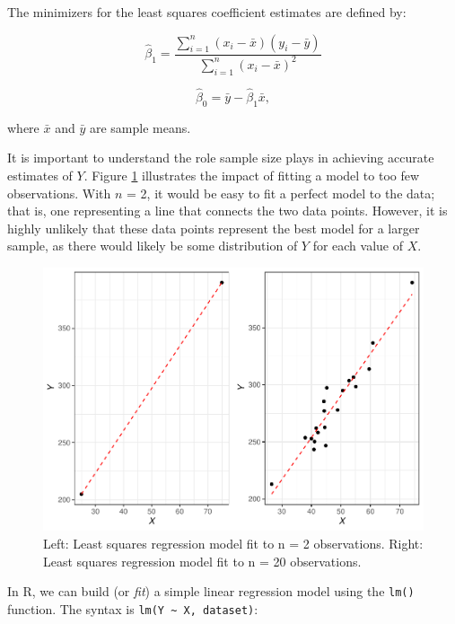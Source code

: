 \documentclass[
]{book}
\begin{document}
The minimizers for the least squares coefficient estimates are defined by:

\[\hat\beta_1 = \frac{\displaystyle\sum_{i=1}^{n}(x_i - \bar{x})(y_i - \bar{y})} {\displaystyle\sum_{i=1}^{n}(x_i - \bar{x})^2}\]

\[\hat\beta_0 = \bar{y} - \hat{\beta}_1 \bar{x},\]

where \(\bar{x}\) and \(\bar{y}\) are sample means.

It is important to understand the role sample size plays in achieving accurate estimates of \(Y\). Figure \ref{fig:lm-fit-compare} illustrates the impact of fitting a model to too few observations. With \(n\) = 2, it would be easy to fit a perfect model to the data; that is, one representing a line that connects the two data points. However, it is highly unlikely that these data points represent the best model for a larger sample, as there would likely be some distribution of \(Y\) for each value of \(X\).

\begin{figure}

{\centering \includegraphics[width=1\linewidth]{The_Fundamentals_of_People_Analytics_files/figure-latex/lm-fit-compare-1} 

}

\caption{Left: Least squares regression model fit to n = 2 observations. Right: Least squares regression model fit to n = 20 observations.}\label{fig:lm-fit-compare}
\end{figure}

In R, we can build (or \emph{fit}) a simple linear regression model using the \texttt{lm()} function. The syntax is \texttt{lm(Y\ \textasciitilde{}\ X,\ dataset)}:
\end{document}
